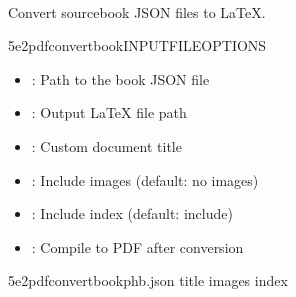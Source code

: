 \documentclass[letterpaper,10pt,english]{sphinxmanual}
\begin{document}
\paragraph{}
\label{\detokenize{user-guide/cli-reference:book}}
\sphinxAtStartPar
Convert sourcebook JSON files to LaTeX.

\begin{sphinxVerbatim}[commandchars=\\\{\}]
5e2pdfconvertbookINPUT\PYGZus{}FILE\PYG{o}{[}OPTIONS\PYG{o}{]}
\end{sphinxVerbatim}

\sphinxAtStartPar
{}
\begin{itemize}
\item {} 
\sphinxAtStartPar
{}: Path to the book JSON file

\end{itemize}

\sphinxAtStartPar
{}
\begin{itemize}
\item {} 
\sphinxAtStartPar
{}: Output LaTeX file path

\item {} 
\sphinxAtStartPar
{}: Custom document title

\item {} 
\sphinxAtStartPar
{}: Include images (default: no images)

\item {} 
\sphinxAtStartPar
{}: Include index (default: include)

\item {} 
\sphinxAtStartPar
{}: Compile to PDF after conversion

\end{itemize}

\sphinxAtStartPar
{}

\begin{sphinxVerbatim}[commandchars=\\\{\}]
5e2pdfconvertbookphb.json
\PYGZhy{}\PYGZhy{}title
\PYGZhy{}\PYGZhy{}images
\PYGZhy{}\PYGZhy{}index
\end{sphinxVerbatim}
\end{document}
